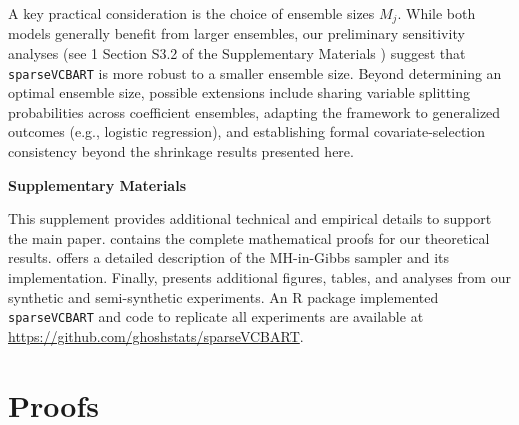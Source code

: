 \documentclass[11pt]{article}
\theoremstyle{plain}
\theoremstyle{definition}
\theoremstyle{plain}
\newcommand{\includesupp}{1}
\newcommand{\switchref}[2]{%
  \if\includesupp1%
    #1%
  \else%
    #2%
  \fi%
}
\begin{document}
A key practical consideration is the choice of ensemble sizes $M_{j}.$ 
While both models generally benefit from larger ensembles, our preliminary sensitivity analyses (see \switchref{}{Section S3.2 of the Supplementary Materials}) suggest that \texttt{sparseVCBART} is more robust to a smaller ensemble size.
Beyond determining an optimal ensemble size, possible extensions include sharing variable splitting probabilities across coefficient ensembles, adapting the framework to generalized outcomes (e.g., logistic regression), and establishing formal covariate-selection consistency beyond the shrinkage results presented here.



\newpage


\newpage
\begin{center}
{\large 
\textbf{Supplementary Materials}
}
\end{center}
\appendix 

\renewcommand{\thesection}{S\arabic{section}}
\renewcommand{\thefigure}{\thesection.\arabic{figure}}
\renewcommand{\thetable}{\thesection.\arabic{table}}
\renewcommand{\theequation}{\thesection.\arabic{equation}}
\renewcommand{\thelemma}{\thesection.\arabic{lemma}}
\renewcommand{\thetheorem}{\thesection.\arabic{theorem}}

This supplement provides additional technical and empirical details to support the main paper. 
 contains the complete mathematical proofs for our theoretical results. 
 offers a detailed description of the MH-in-Gibbs sampler and its implementation. 
Finally,  presents additional figures, tables, and analyses from our synthetic and semi-synthetic experiments.
An \textsf{R} package implemented \texttt{sparseVCBART} and code to replicate all experiments are available at \url{https://github.com/ghoshstats/sparseVCBART}.

\setcounter{section}{0}
\setcounter{figure}{0}
\setcounter{equation}{0}
\setcounter{table}{0}
\setcounter{theorem}{0}
\section{Proofs}
\label{sec:proofs}

% 
% 
\end{document}
